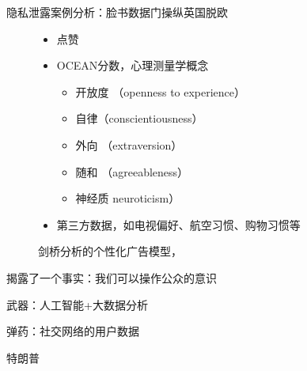 \documentclass[11pt]{beamer}
\begin{document}
\begin{frame}[allowframebreaks]{隐私泄露案例分析：脸书数据门操纵英国脱欧}
\newpage
\begin{figure}
	\begin{itemize}
		\item 点赞
		\item OCEAN分数，心理测量学概念
		\begin{itemize}
			\item 开放度 （openness to experience）
			\item 自律（conscientiousness）
			\item 外向 （extraversion）
			\item 随和 （agreeableness）
			\item 神经质 neuroticism）
		\end{itemize}
		\item 第三方数据，如电视偏好、航空习惯、购物习惯等
	\end{itemize}
	\caption{剑桥分析的个性化广告模型， }
\end{figure}
\newpage

揭露了一个事实：我们可以操作公众的意识

武器：人工智能+大数据分析

弹药：社交网络的用户数据

\newpage

	\newpage
	特朗普
	
	\begin{figure}
		\centering
		

\end{figure}
\end{frame}
\end{document}
